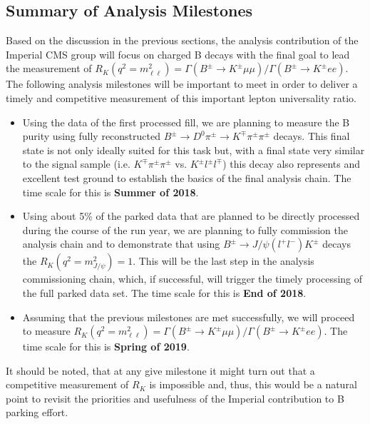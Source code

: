 \documentclass[a4paper,11pt]{article}
\begin{document}
\subsection{Summary of Analysis Milestones}\label{summary}
Based on the discussion in the previous sections, the analysis contribution of the Imperial CMS group will focus on charged B decays with the final goal to lead the measurement of  $R_{K} (q^2 = m_{\ell\ell}^2)= \Gamma (B^{\pm} \rightarrow K^{\pm} \mu \mu )/\Gamma (B^{\pm} \rightarrow K^{\pm}  e e)$. The following analysis milestones will be important to meet in order to deliver a timely and competitive measurement of this important lepton universality ratio. 

\begin{itemize} 
\item Using the data of the first processed fill, we are planning to measure the B purity using fully reconstructed $B^{\pm} \rightarrow D^0 \pi^{\pm} \rightarrow K^{\mp}  \pi^{\pm} \pi^{\pm}$ decays. This final state is not only ideally suited for this task but, with a final state very similar to the signal sample (i.e.  $K^{\mp}  \pi^{\pm} \pi^{\pm}$ vs. $K^{\pm}  l^{\pm} l^{\mp}$) this decay also represents and excellent test ground to establish the basics of the final analysis chain. The time scale for this is {\bf Summer of 2018}. 

\item  Using about 5\% of the parked data that are planned to be directly processed during the course of the run year, we are planning to fully commission the analysis chain and to demonstrate that using $B^{\pm} \rightarrow J/\psi(l^+l^-)  K^{\pm}$ decays the $R_{K} (q^2 = m_{J/\psi}^2) =1$. This will be the last step in the analysis commissioning chain, which, if successful, will trigger the timely processing of the full parked data set. The time scale for this is {\bf End of 2018}. 

\item Assuming that the previous milestones are met successfully, we will proceed to measure $R_{K} (q^2 = m_{\ell\ell}^2)= \Gamma (B^{\pm} \rightarrow K^{\pm} \mu \mu )/\Gamma (B^{\pm} \rightarrow K^{\pm}  e e)$.   The time scale for this is {\bf Spring of 2019}.

\end{itemize}

It should be noted, that at any give milestone it might turn out that a competitive measurement of $R_{K}$ is impossible and, thus, this would be a natural point to revisit the priorities and usefulness of the Imperial contribution to B parking effort.   
\end{document}

